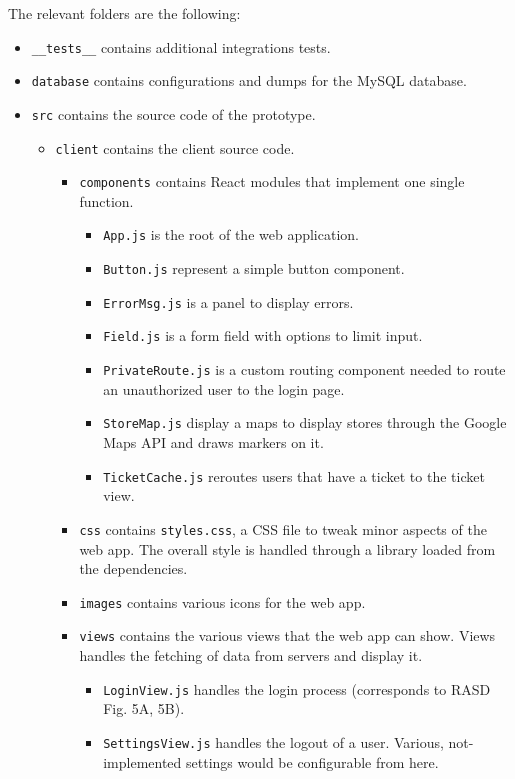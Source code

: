 \documentclass[
]{article}
\begin{document}
The relevant folders are the following:

\begin{itemize}
  \item \texttt{\_\_tests\_\_} contains additional integrations tests.
  \item \texttt{database} contains configurations and dumps for the MySQL database.
  \item \texttt{src} contains the source code of the prototype.
  \begin{itemize}
    \item \texttt{client} contains the client source code.
    \begin{itemize}
      \item \texttt{components} contains React modules that implement one single function.
      \begin{itemize}
        \item \texttt{App.js} is the root of the web application.
        \item \texttt{Button.js} represent a simple button component.
        \item \texttt{ErrorMsg.js} is a panel to display errors.
        \item \texttt{Field.js} is a form field with options to limit input.
        \item \texttt{PrivateRoute.js} is a custom routing component needed to route an unauthorized user to the login page.
        \item \texttt{StoreMap.js} display a maps to display stores through the Google Maps API and draws markers on it.
        \item \texttt{TicketCache.js} reroutes users that have a ticket to the ticket view.
      \end{itemize}
      \item \texttt{css} contains \texttt{styles.css}, a CSS file to tweak minor aspects of the web app. The overall style is handled through a library loaded from the dependencies.
      \item \texttt{images} contains various icons for the web app.
      \item \texttt{views} contains the various views that the web app can show. Views handles the fetching of data from servers and display it.
      \begin{itemize}
        \item \texttt{LoginView.js} handles the login process (corresponds to RASD Fig. 5A, 5B).
        \item \texttt{SettingsView.js} handles the logout of a user. Various, not-implemented settings would be configurable from here.

\end{itemize}
\end{itemize}
\end{itemize}
\end{itemize}
\end{document}

